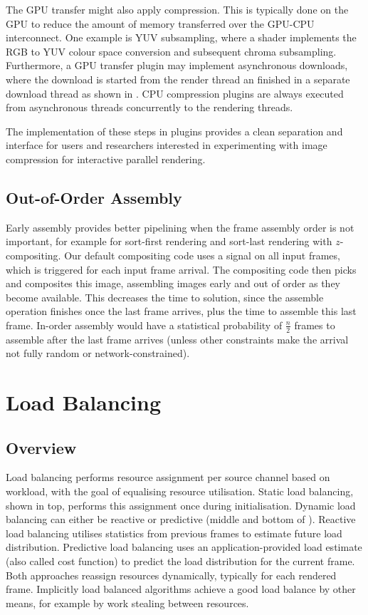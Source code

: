 The GPU transfer might also apply compression. This is typically done on the
GPU to reduce the amount of memory transferred over the GPU-CPU interconnect.
One example is YUV subsampling, where a shader implements the RGB to YUV colour
space conversion and subsequent chroma subsampling. Furthermore, a GPU transfer
plugin may implement asynchronous downloads, where the download is started
from the render thread an finished in a separate download thread as shown in
. CPU compression plugins are always executed from asynchronous
threads concurrently to the rendering threads.

The implementation of these steps in plugins provides a clean separation and
interface for users and researchers interested in experimenting with image
compression for interactive parallel rendering.

\section{Out-of-Order Assembly}\label{sEarlyAss}

Early assembly provides better pipelining when the frame assembly order is not
important, for example for sort-first rendering and sort-last rendering with
$z$-compositing. Our default compositing code uses a signal on all input
frames, which is triggered for each input frame arrival. The compositing code
then picks and composites this image, assembling images early and out of order as
they become available. This decreases the time to solution, since the assemble
operation finishes once the last frame arrives, plus the time to assemble this
last frame. In-order assembly would have a statistical probability of
$\frac{n}{2}$ frames to assemble after the last frame arrives (unless other
constraints make the arrival not fully random or network-constrained).

\chapter{Load Balancing}\label{sLoadBalancing}

\section{Overview}

Load balancing performs resource assignment per source channel based on
workload, with the goal of equalising resource utilisation. Static load
balancing, shown in  top, performs this assignment once
during initialisation. Dynamic load balancing can either be reactive or
predictive (middle and bottom of ). Reactive load balancing
utilises statistics from previous frames to estimate future load distribution.
Predictive load balancing uses an application-provided load estimate (also
called cost function) to predict the load distribution for the current frame.
Both approaches reassign resources dynamically, typically for each rendered
frame. Implicitly load balanced algorithms achieve a good load balance by other
means, for example by work stealing between resources.

